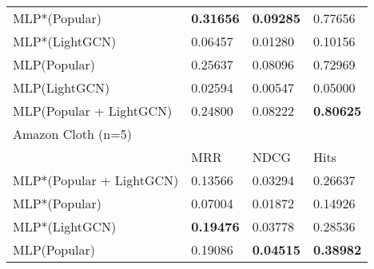 \begin{tabular}{llll}
 MLP*(Popular)            & \textbf{0.31656}                                                 & \textbf{0.09285}                                                 & 0.77656                                                 \\
 MLP*(LightGCN)           & 0.06457                                                 & 0.01280                                                 & 0.10156                                                 \\
 MLP(Popular)             & 0.25637                                                 & 0.08096                                                 & 0.72969                                                 \\
 MLP(LightGCN)            & 0.02594                                                 & 0.00547                                                 & 0.05000                                                 \\
 MLP(Popular + LightGCN)  & 0.24800 & 0.08222 & \textbf{0.80625}  \\\hline
 Amazon Cloth (n=5)       &                                                         &                                                         &                                                         \\\hline
                          & MRR                                                     & NDCG                                                    & Hits                                                    \\\hline
 MLP*(Popular + LightGCN) & 0.13566                                                 & 0.03294                                                 & 0.26637                                                 \\
 MLP*(Popular)            & 0.07004                                                 & 0.01872                                                 & 0.14926                                                 \\
 MLP*(LightGCN)           & \textbf{0.19476}                                                 & 0.03778                                                 & 0.28536                                                 \\
 MLP(Popular)             & 0.19086                                                 & \textbf{0.04515}                                                 & \textbf{0.38982}                                                 \\

\end{tabular}

